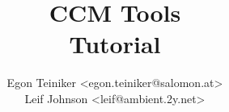 \documentclass{report}
\title{{\Huge CCM Tools}\\Tutorial}
\author{Egon Teiniker <egon.teiniker@salomon.at>\\
Leif Johnson <leif@ambient.2y.net>}
\begin{document}
\maketitle
{}
\tableofcontents
\listoffigures

\newpage
{}
\setlength{\parskip}{1em}







%
%
%


\begin{appendix}



\end{appendix}



\end{document}
